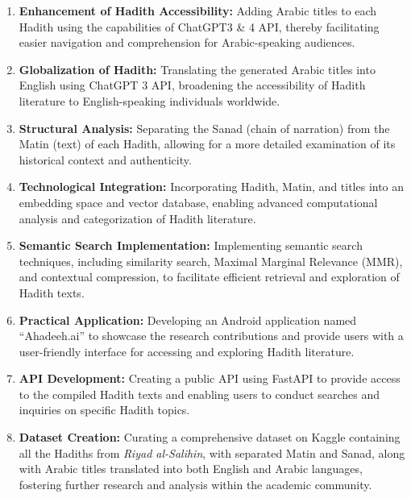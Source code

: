 \documentclass{svproc}
\begin{document}
\begin{enumerate}
    \item \textbf{Enhancement of Hadith Accessibility:} Adding Arabic titles to each Hadith using the capabilities of ChatGPT3 \& 4 API, thereby facilitating easier navigation and comprehension for Arabic-speaking audiences.
    
    \item \textbf{Globalization of Hadith:} Translating the generated Arabic titles into English using ChatGPT 3 API, broadening the accessibility of Hadith literature to English-speaking individuals worldwide.
    
    \item \textbf{Structural Analysis:} Separating the Sanad (chain of narration) from the Matin (text) of each Hadith, allowing for a more detailed examination of its historical context and authenticity.
    
    \item \textbf{Technological Integration:} Incorporating Hadith, Matin, and titles into an embedding space and vector database, enabling advanced computational analysis and categorization of Hadith literature.
    
    \item \textbf{Semantic Search Implementation:} Implementing semantic search techniques, including similarity search, Maximal Marginal Relevance (MMR), and contextual compression, to facilitate efficient retrieval and exploration of Hadith texts.
    
    \item \textbf{Practical Application:} Developing an Android application named ``Ahadeeh.ai'' to showcase the research contributions and provide users with a user-friendly interface for accessing and exploring Hadith literature.
    
    \item \textbf{API Development:} Creating a public API using FastAPI to provide access to the compiled Hadith texts and enabling users to conduct searches and inquiries on specific Hadith topics.
    
    \item \textbf{Dataset Creation:} Curating a comprehensive dataset on Kaggle containing all the Hadiths from \textit{Riyad al-Salihin}, with separated Matin and Sanad, along with Arabic titles translated into both English and Arabic languages, fostering further research and analysis within the academic community.
\end{enumerate}
\end{document}
